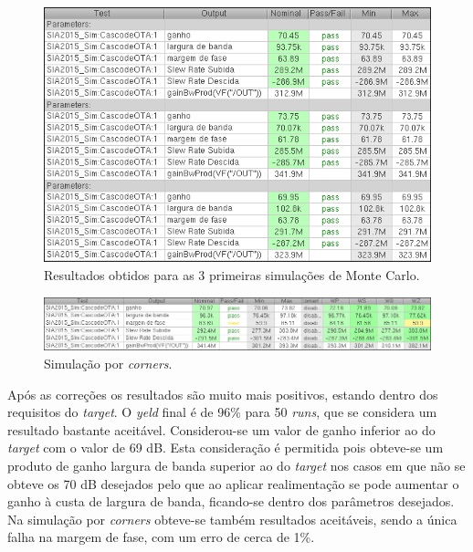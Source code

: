 \documentclass[11pt]{article}
\numberwithin{equation}{section}
\begin{document}
\begin{figure}[H]
	\centering
	\includegraphics[keepaspectratio=true, scale=0.65]{exps/MonteCarlo_3pt_Novo}
	\vspace{-0.5em}
	\caption{Resultados obtidos para as 3 primeiras simulações de Monte Carlo.}
	\vspace{-0.8em}
\end{figure} 

\begin{figure}[H]
	\centering
	\includegraphics[keepaspectratio=true, scale=0.65]{exps/Corners_Novo_semDiv}
	\vspace{-0.5em}
	\caption{Simulação por \textit{corners}.}
	\vspace{-0.8em}
\end{figure} 

Após as correções os resultados são muito mais positivos, estando dentro dos requisitos do \textit{target}. O \textit{yeld} final é de 96\% para 50 \textit{runs}, que se considera um resultado bastante aceitável. Considerou-se um valor de ganho inferior ao do \textit{target} com o valor de 69 dB. Esta consideração é permitida pois obteve-se um produto de ganho largura de banda superior ao do \textit{target} nos casos em que não se obteve os 70 dB desejados pelo que ao aplicar realimentação se pode aumentar o ganho à custa de largura de banda, ficando-se dentro dos parâmetros desejados.
Na simulação por \textit{corners} obteve-se também resultados aceitáveis, sendo a única falha na margem de fase, com um erro de cerca de 1\%. 
\end{document}
